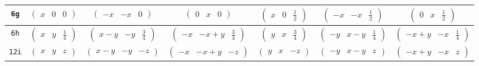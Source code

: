 \documentclass[fleqn,9pt,landscape]{jsarticle}
\begin{document}
\begin{center}
\begin{longtable}{ccccccc}
{\tt 6g} & $ \begin{pmatrix} x & 0 & 0 \end{pmatrix} $ & $ \begin{pmatrix} - x & - x & 0 \end{pmatrix} $ & $ \begin{pmatrix} 0 & x & 0 \end{pmatrix} $ & $ \begin{pmatrix} x & 0 & \frac{1}{2} \end{pmatrix} $ & $ \begin{pmatrix} - x & - x & \frac{1}{2} \end{pmatrix} $ & $ \begin{pmatrix} 0 & x & \frac{1}{2} \end{pmatrix} $ \\ \hline
{\tt 6h} & $ \begin{pmatrix} x & y & \frac{1}{4} \end{pmatrix} $ & $ \begin{pmatrix} x - y & - y & \frac{3}{4} \end{pmatrix} $ & $ \begin{pmatrix} - x & - x + y & \frac{3}{4} \end{pmatrix} $ & $ \begin{pmatrix} y & x & \frac{3}{4} \end{pmatrix} $ & $ \begin{pmatrix} - y & x - y & \frac{1}{4} \end{pmatrix} $ & $ \begin{pmatrix} - x + y & - x & \frac{1}{4} \end{pmatrix} $ \\ \hline
{\tt 12i} & $ \begin{pmatrix} x & y & z \end{pmatrix} $ & $ \begin{pmatrix} x - y & - y & - z \end{pmatrix} $ & $ \begin{pmatrix} - x & - x + y & - z \end{pmatrix} $ & $ \begin{pmatrix} y & x & - z \end{pmatrix} $ & $ \begin{pmatrix} - y & x - y & z \end{pmatrix} $ & $ \begin{pmatrix} - x + y & - x & z \end{pmatrix} $ \\

\end{longtable}
\end{center}
\end{document}

